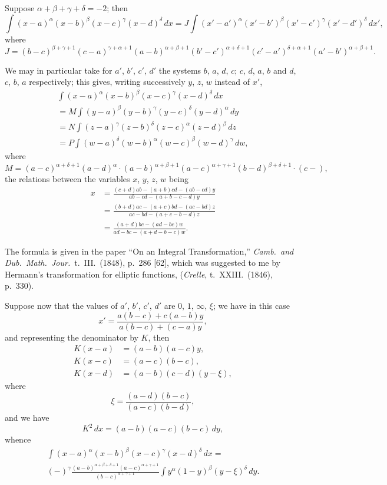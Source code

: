 \documentclass[11pt,a4paper]{book}
\begin{document}
Suppose $\alpha + \beta + \gamma + \delta = -2$; then
\[
\int (x-a)^\alpha (x-b)^\beta (x-c)^\gamma (x-d)^\delta \, dx
= J \int (x'-a')^\alpha (x'-b')^\beta (x'-c')^\gamma (x'-d')^\delta \, dx',
\]
where
\[
J = (b-c)^{\beta+\gamma+1} (c-a)^{\gamma+\alpha+1} (a-b)^{\alpha+\beta+1} (b'-c')^{\alpha+\delta+1} (c'-a')^{\delta+\alpha+1} (a'-b')^{\alpha+\beta+1}.
\]

We may in particular take for $a'$, $b'$, $c'$, $d'$ the systems $b$, $a$, $d$, $c$; $c$, $d$, $a$, $b$ and $d$, $c$, $b$, $a$ respectively; this gives, writing successively $y$, $z$, $w$ instead of $x'$,
\begin{multline*}
\int (x-a)^\alpha (x-b)^\beta (x-c)^\gamma (x-d)^\delta \, dx \\
= M \int (y-a)^\beta (y-b)^\gamma (y-c)^\delta (y-d)^\alpha \, dy \\
= N \int (z-a)^\gamma (z-b)^\delta (z-c)^\alpha (z-d)^\beta \, dz \\
= P \int (w-a)^\delta (w-b)^\alpha (w-c)^\beta (w-d)^\gamma \, dw,
\end{multline*}
where
\[
M = (a-c)^{\alpha+\delta+1} (a-d)^{\alpha} \cdot (a-b)^{\alpha+\beta+1} (a-c)^{\alpha+\gamma+1} (b-d)^{\beta+\delta+1} \cdot (c-),
\]
the relations between the variables $x$, $y$, $z$, $w$ being
\begin{align*}
x &= \frac{(c+d)ab - (a+b)cd - (ab-cd)y}{ab-cd - (a+b-c-d)y} \\
&= \frac{(b+d)ac - (a+c)bd - (ac-bd)z}{ac-bd - (a+c-b-d)z} \\
&= \frac{(a+d)bc - (ad-bc)w}{ad-bc - (a+d-b-c)w}.
\end{align*}

The formula is given in the paper ``On an Integral Transformation,'' \textit{Camb.\ and Dub.\ Math.\ Jour.}\ t.~III.\ (1848), p.~286 [62], which was suggested to me by Hermann's transformation for elliptic functions, (\textit{Crelle}, t.~XXIII.\ (1846), p.~330).

Suppose now that the values of $a'$, $b'$, $c'$, $d'$ are $0$, $1$, $\infty$, $\xi$; we have in this case
\[
x' = \frac{a(b-c) + c(a-b)y}{a(b-c) + (c-a)y},
\]
and representing the denominator by $K$, then
\begin{align*}
K(x-a) &= (a-b)(a-c)y, \\
K(x-c) &= (a-c)(b-c), \\
K(x-d) &= (a-b)(c-d)(y-\xi),
\end{align*}
where
\[
\xi = \frac{(a-d)(b-c)}{(a-c)(b-d)},
\]
and we have
\[
K^2 \, dx = (a-b)(a-c)(b-c) \, dy,
\]
whence
\begin{multline*}
\int (x-a)^\alpha (x-b)^\beta (x-c)^\gamma (x-d)^\delta \, dx = \\
(-)^{\gamma} \frac{(a-b)^{\alpha+\beta+\delta+1} (a-c)^{\alpha+\gamma+1}}{(b-c)^{\alpha+\gamma+1}}
\int y^\alpha (1-y)^\beta (y-\xi)^\delta \, dy.
\end{multline*}
\end{document}
